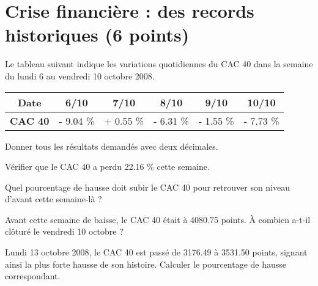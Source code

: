\section{Crise financière : des records historiques (6 points)}

Le tableau suivant indique les variations quotidiennes du CAC 40 dans la semaine du lundi 6 au vendredi 10 octobre 2008.

\begin{center}
	\begin{tabular}{|@{\ }c@{\ }|@{\ }c@{\ }|@{\ }c@{\ }|@{\ }c@{\ }|@{\ }c@{\ }|@{\ }c@{\ }|}
		\hline
		\textbf{Date}   & \textbf{6/10}   & \textbf{7/10}   & \textbf{8/10}   & \textbf{9/10}  & \textbf{10/10} \\ \hline
		\textbf{CAC 40} & - \num{9.04} \% & + \num{0.55} \% & - \num{6.31} \% & - \num{1.55} \% & - \num{7.73} \%  \\ \hline
	\end{tabular}
\end{center}

Donner tous les résultats demandés avec deux décimales.

\begin{questions}
	\question[1\half] Vérifier que le CAC 40 a perdu \num{22.16} \% cette semaine.
	
	\question[1\half] Quel pourcentage de hausse doit subir le CAC 40 pour retrouver son niveau d'avant cette semaine-là ?
	
	\question[1\half] Avant cette semaine de baisse, le CAC 40 était à \num{4080.75} points. \`A combien a-t-il clôturé le vendredi 10 octobre ?
	
	\question[1\half] Lundi 13 octobre 2008, le CAC 40 est passé de \num{3176.49} à \num{3531.50} points, signant ainsi la plus forte hausse de son histoire. 
	Calculer le pourcentage de hausse correspondant.  
\end{questions} 
